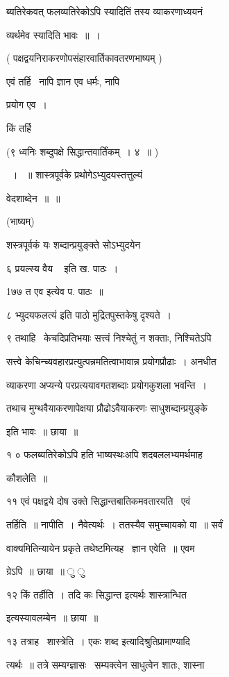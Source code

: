\documentclass[11pt, openany]{book}
\begin{document}
ब्यतिरेकवत् फलव्यतिरेकोऽपि स्यादितिं तस्य व्याकरणाध्ययनं 

व्यर्थमेव स्यादिति भावः~॥~। 

( पक्षद्वयनिराकरणोपसंहारवार्तिकावतरणभाष्यम् ) 

एवं तर्हि \textendash\ नापि ज्ञान एव धर्मः, नापि 

प्रयोग एव~। 

किं तर्हि 

(९ ध्वनिः शब्दुपक्षे सिद्धान्तवार्तिंकम्~। ४~॥ ) 

~। ~॥ शास्त्रपूर्वके प्रथोगेऽभ्युदयस्तत्तुल्यं 

वेदशाब्देन~॥~॥ 

(भाष्यम्) 

शस्त्रपूर्वकं यः शब्दान्प्रयुङ्क्ते सोऽभ्युदयेन 



६ {\qt प्रयल्स्य वैय \textendash\ } इति ख. पाठः~। 

1७७ {\qt त एव} इत्येव प. पाठः~॥ 

८ {\qt भ्युदयफलत्यं} इति पाठो मुद्रितपुस्तकेषु दृश्यते~। 

९ तथाहि \textendash\ केचदिप्रतिभयाः सत्त्वं निश्चेतुं न शक्ताः, निश्चितेऽपि 

सत्त्वे केचिन्च्यवहारप्रत्युत्पन्नमतित्वाभावान्न प्रयोगप्रौढाः~। अनधीत \textendash\ 


व्याकरणा अप्यन्ये परप्रत्ययावगतशब्दाः प्रयोगकुशला भवन्ति~। 

तथाच मुग्थवैयाकरणापेक्षया प्रौढोऽवैयाकरणः साधुशब्दान्प्रयुङ्के 

इति भावः~॥ छाया~॥ 

१ ० {\qt फलब्यतिरेकोऽपि} हति भाष्यस्थःअपि शदबललभ्यमर्थमाह \textendash\ 

कौशलेति~॥ 

११ एवं पक्षद्वये दोष उक्ते सिद्धान्तबातिकमवतारयति \textendash\ एवं 

तर्हिति~॥ नापीति~। नैवेत्यर्थः~। ततस्यैव समुच्चायको वा~॥ सर्वं 

वाक्यमितिन्यायेन प्रकृते तथेष्टमित्यह \textendash\ ज्ञान एवेति~॥ एवम \textendash\ 

ग्रेऽपि~॥ छाया~॥ ु ु 

१२ किं तर्हीति~। तदि कः सिद्धान्त इत्यर्थः शास्त्रान्धित 

इत्यस्यावलम्बेन~॥ छाया~॥ 

१३ तत्राह \textendash\ शास्त्रेति~। एकः शब्द इत्यादिश्रुतिप्रामाण्यादि \textendash\ 

त्यर्थः~॥ तत्रे सम्यग्ज्ञासः \textendash\ सम्यक्त्वेन साधुत्वेन शातः, शास्ना \textendash\ 
\end{document}
